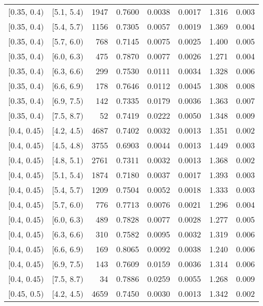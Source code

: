 \begin{longtable}{| l | l | r | r | r | r | r | r |}
        $[$0.35, 0.4$)$ & $[$5.1, 5.4$)$ & 1947 & 0.7600 & 0.0038 & 0.0017 & 1.316 & 0.003 \\
        $[$0.35, 0.4$)$ & $[$5.4, 5.7$)$ & 1156 & 0.7305 & 0.0057 & 0.0019 & 1.369 & 0.004 \\
        $[$0.35, 0.4$)$ & $[$5.7, 6.0$)$ & 768 & 0.7145 & 0.0075 & 0.0025 & 1.400 & 0.005 \\
        $[$0.35, 0.4$)$ & $[$6.0, 6.3$)$ & 475 & 0.7870 & 0.0077 & 0.0026 & 1.271 & 0.004 \\
        $[$0.35, 0.4$)$ & $[$6.3, 6.6$)$ & 299 & 0.7530 & 0.0111 & 0.0034 & 1.328 & 0.006 \\
        $[$0.35, 0.4$)$ & $[$6.6, 6.9$)$ & 178 & 0.7646 & 0.0112 & 0.0045 & 1.308 & 0.008 \\
        $[$0.35, 0.4$)$ & $[$6.9, 7.5$)$ & 142 & 0.7335 & 0.0179 & 0.0036 & 1.363 & 0.007 \\
        $[$0.35, 0.4$)$ & $[$7.5, 8.7$)$ & 52 & 0.7419 & 0.0222 & 0.0050 & 1.348 & 0.009 \\
        $[$0.4, 0.45$)$ & $[$4.2, 4.5$)$ & 4687 & 0.7402 & 0.0032 & 0.0013 & 1.351 & 0.002 \\
        $[$0.4, 0.45$)$ & $[$4.5, 4.8$)$ & 3755 & 0.6903 & 0.0044 & 0.0013 & 1.449 & 0.003 \\
        $[$0.4, 0.45$)$ & $[$4.8, 5.1$)$ & 2761 & 0.7311 & 0.0032 & 0.0013 & 1.368 & 0.002 \\
        $[$0.4, 0.45$)$ & $[$5.1, 5.4$)$ & 1874 & 0.7180 & 0.0037 & 0.0017 & 1.393 & 0.003 \\
        $[$0.4, 0.45$)$ & $[$5.4, 5.7$)$ & 1209 & 0.7504 & 0.0052 & 0.0018 & 1.333 & 0.003 \\
        $[$0.4, 0.45$)$ & $[$5.7, 6.0$)$ & 776 & 0.7713 & 0.0076 & 0.0021 & 1.296 & 0.004 \\
        $[$0.4, 0.45$)$ & $[$6.0, 6.3$)$ & 489 & 0.7828 & 0.0077 & 0.0028 & 1.277 & 0.005 \\
        $[$0.4, 0.45$)$ & $[$6.3, 6.6$)$ & 310 & 0.7582 & 0.0095 & 0.0032 & 1.319 & 0.006 \\
        $[$0.4, 0.45$)$ & $[$6.6, 6.9$)$ & 169 & 0.8065 & 0.0092 & 0.0038 & 1.240 & 0.006 \\
        $[$0.4, 0.45$)$ & $[$6.9, 7.5$)$ & 143 & 0.7609 & 0.0159 & 0.0036 & 1.314 & 0.006 \\
        $[$0.4, 0.45$)$ & $[$7.5, 8.7$)$ & 34 & 0.7886 & 0.0259 & 0.0055 & 1.268 & 0.009 \\
        $[$0.45, 0.5$)$ & $[$4.2, 4.5$)$ & 4659 & 0.7450 & 0.0030 & 0.0013 & 1.342 & 0.002 \\

\end{longtable}
